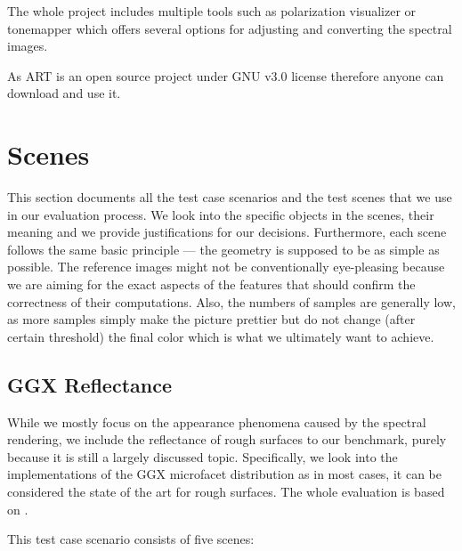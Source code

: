 The whole project includes multiple tools such as polarization visualizer or tonemapper which offers several options for adjusting and converting the spectral images.

As ART is an open source project under GNU v3.0 license therefore anyone can download and use it.

\section{Scenes}
\label{sec:scenes}

This section documents all the test case scenarios and the test scenes that we use in our evaluation process. We look into the specific objects in the scenes, their meaning and we provide justifications for our decisions. Furthermore, each scene follows the same basic principle --- the geometry is supposed to be as simple as possible. The reference images might not be conventionally eye-pleasing because we are aiming for the exact aspects of the features that should confirm the correctness of their computations. Also, the numbers of samples are generally low, as more samples simply make the picture prettier but do not change (after certain threshold) the final color which is what we ultimately want to achieve.

\subsection{GGX Reflectance}

While we mostly focus on the appearance phenomena caused by the spectral rendering, we include the reflectance of rough surfaces to our benchmark, purely because it is still a largely discussed topic. Specifically, we look into the implementations of the GGX microfacet distribution as in most cases, it can be considered the state of the art for rough surfaces. The whole evaluation is based on \citet{walter2007microfacet}.

This test case scenario consists of five scenes:

